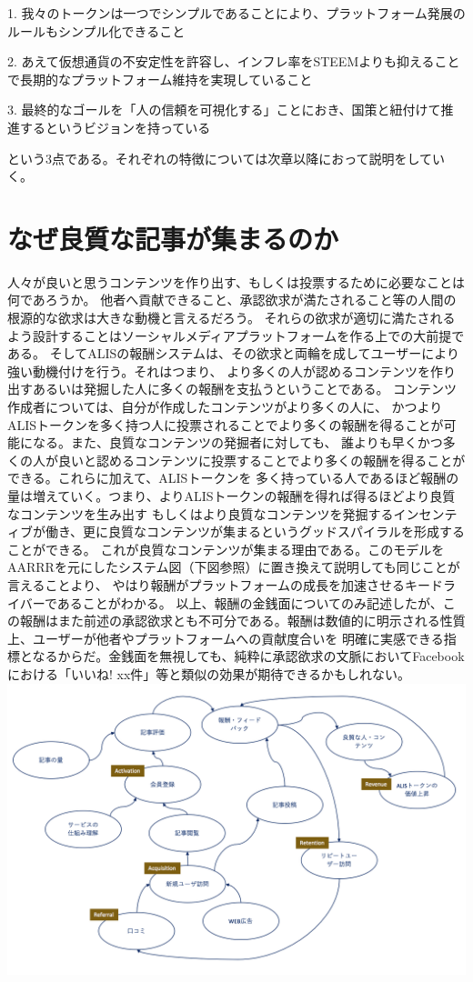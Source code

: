 \documentclass{jsarticle}
\begin{document}
1. 我々のトークンは一つでシンプルであることにより、プラットフォーム発展のルールもシンプル化できること

2. あえて仮想通貨の不安定性を許容し、インフレ率をSTEEMよりも抑えることで長期的なプラットフォーム維持を実現していること

3. 最終的なゴールを「人の信頼を可視化する」ことにおき、国策と紐付けて推進するというビジョンを持っている

という3点である。それぞれの特徴については次章以降におって説明をしていく。
\section{なぜ良質な記事が集まるのか}
人々が良いと思うコンテンツを作り出す、もしくは投票するために必要なことは何であろうか。  
他者へ貢献できること、承認欲求が満たされること等の人間の根源的な欲求は大きな動機と言えるだろう。
それらの欲求が適切に満たされるよう設計することはソーシャルメディアプラットフォームを作る上での大前提である。
そしてALISの報酬システムは、その欲求と両輪を成してユーザーにより強い動機付けを行う。それはつまり、
より多くの人が認めるコンテンツを作り出すあるいは発掘した人に多くの報酬を支払うということである。
コンテンツ作成者については、自分が作成したコンテンツがより多くの人に、
かつよりALISトークンを多く持つ人に投票されることでより多くの報酬を得ることが可能になる。また、良質なコンテンツの発掘者に対しても、
誰よりも早くかつ多くの人が良いと認めるコンテンツに投票することでより多くの報酬を得ることができる。これらに加えて、ALISトークンを
多く持っている人であるほど報酬の量は増えていく。つまり、よりALISトークンの報酬を得れば得るほどより良質なコンテンツを生み出す
もしくはより良質なコンテンツを発掘するインセンティブが働き、更に良質なコンテンツが集まるというグッドスパイラルを形成することができる。
これが良質なコンテンツが集まる理由である。このモデルをAARRRを元にしたシステム図（下図参照）に置き換えて説明しても同じことが言えることより、
やはり報酬がプラットフォームの成長を加速させるキードライバーであることがわかる。
以上、報酬の金銭面についてのみ記述したが、この報酬はまた前述の承認欲求とも不可分である。報酬は数値的に明示される性質上、ユーザーが他者やプラットフォームへの貢献度合いを
明確に実感できる指標となるからだ。金銭面を無視しても、純粋に承認欲求の文脈においてFacebookにおける「いいね! xx件」等と類似の効果が期待できるかもしれない。
	\includegraphics[scale=0.6]{img/systemthinking-with-AARRR.png}
\end{document}
